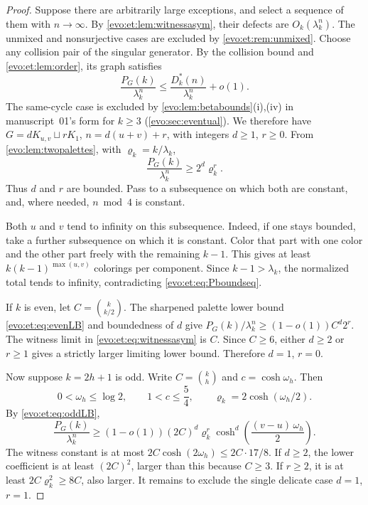 \documentclass[11pt,a4paper]{article}
\numberwithin{equation}{section}
\theoremstyle{definition}
\theoremstyle{remark}
\begin{document}
\begin{proof}
Suppose there are arbitrarily large exceptions, and select a sequence of them
with $n\to\infty$. By \cref{evo:et:lem:witnessasym}, their defects are
$O_k(\lambda_k^n)$. The unmixed and nonsurjective cases are excluded by
\cref{evo:et:rem:unmixed}. Choose any collision pair of the singular
generator. By the collision bound and \cref{evo:et:lem:order}, its graph
satisfies
\begin{equation}\label{evo:et:eq:Pboundseq}
 \frac{P_G(k)}{\lambda_k^n}\le\frac{D^*_k(n)}{\lambda_k^n}+o(1).
\end{equation}
The same-cycle case is excluded by \cref{evo:lem:betabounds}(i),(iv) in
manuscript~01's form for $k\ge3$ (\cref{evo:sec:eventual}). We therefore have
$G=dK_{u,v}\sqcup rK_1$, $n=d(u+v)+r$, with integers $d\ge1$, $r\ge0$. From
\cref{evo:lem:twopalettes}, with $\varrho_k=k/\lambda_k$,
\begin{equation}\label{evo:et:eq:boundeddr}
 \frac{P_G(k)}{\lambda_k^n}\ge2^d\varrho_k^r.
\end{equation}
Thus $d$ and $r$ are bounded. Pass to a subsequence on which both are
constant, and, where needed, $n\bmod4$ is constant.

Both $u$ and $v$ tend to infinity on this subsequence. Indeed, if one stays
bounded, take a further subsequence on which it is constant. Color that part
with one color and the other part freely with the remaining $k-1$. This gives
at least $k(k-1)^{\max(u,v)}$ colorings per component. Since
$k-1>\lambda_k$, the normalized total tends to infinity, contradicting
\eqref{evo:et:eq:Pboundseq}.

If $k$ is even, let $C=\binom{k}{k/2}$. The sharpened palette lower bound
\eqref{evo:et:eq:evenLB} and boundedness of $d$ give
$P_G(k)/\lambda_k^n\ge(1-o(1))C^d2^r$. The witness limit in
\eqref{evo:et:eq:witnessasym} is $C$. Since $C\ge6$, either $d\ge2$ or $r\ge1$
gives a strictly larger limiting lower bound. Therefore $d=1$, $r=0$.

Now suppose $k=2h+1$ is odd. Write $C=\binom kh$ and $c=\cosh\omega_h$. Then
\[
 0<\omega_h\le\log2,\qquad 1<c\le\frac54,
 \qquad\varrho_k=2\cosh(\omega_h/2).
\]
By \eqref{evo:et:eq:oddLB},
\begin{equation}\label{evo:et:eq:oddsep}
 \frac{P_G(k)}{\lambda_k^n}\ge
 (1-o(1))(2C)^d\varrho_k^r
 \cosh^d\!\left(\frac{(v-u)\,\omega_h}2\right).
\end{equation}
The witness constant is at most $2C\cosh(2\omega_h)\le2C\cdot17/8$. If
$d\ge2$, the lower coefficient is at least $(2C)^2$, larger than this because
$C\ge3$. If $r\ge2$, it is at least $2C\varrho_k^2\ge8C$, also larger. It
remains to exclude the single delicate case $d=1$, $r=1$.


\end{proof}
\end{document}

